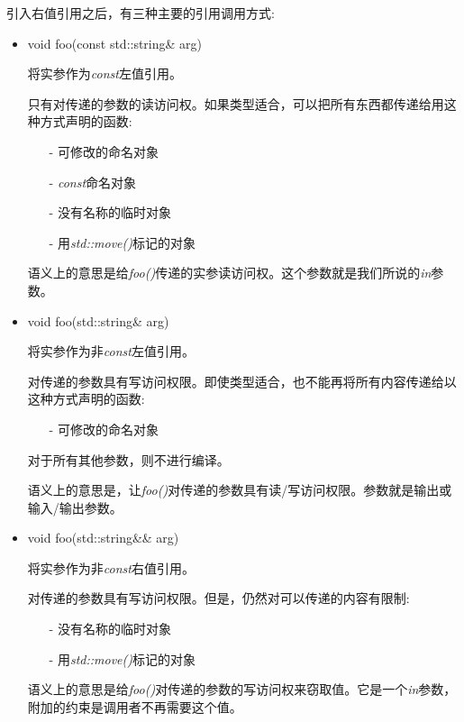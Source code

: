 引入右值引用之后，有三种主要的引用调用方式:

\begin{itemize}
	\item \begin{cppcode}
void foo(const std::string\& arg)
\end{cppcode}
	将实参作为\textit{const}左值引用。

	只有对传递的参数的读访问权。如果类型适合，可以把所有东西都传递给用这种方式声明的函数:

	\begin{itemize}
		\item[-] 可修改的命名对象
		\item[-] \textit{const}命名对象
		\item[-] 没有名称的临时对象
		\item[-] 用\textit{std::move()}标记的对象
	\end{itemize}
	语义上的意思是给\textit{foo()}传递的实参读访问权。这个参数就是我们所说的\textit{in}参数。
	\item \begin{cppcode}
void foo(std::string\& arg)
\end{cppcode}
	将实参作为非\textit{const}左值引用。

	对传递的参数具有写访问权限。即使类型适合，也不能再将所有内容传递给以这种方式声明的函数:

	\begin{itemize}
		\item[-] 可修改的命名对象
	\end{itemize}
	对于所有其他参数，则不进行编译。

	语义上的意思是，让\textit{foo()}对传递的参数具有读/写访问权限。参数就是输出或输入/输出参数。

	\item \begin{cppcode}
void foo(std::string\&\& arg)
\end{cppcode}
	将实参作为非\textit{const}右值引用。

	对传递的参数具有写访问权限。但是，仍然对可以传递的内容有限制:

	\begin{itemize}
		\item[-] 没有名称的临时对象
		\item[-] 用\textit{std::move()}标记的对象
	\end{itemize}
	语义上的意思是给\textit{foo()}对传递的参数的写访问权来窃取值。它是一个\textit{in}参数，附加的约束是调用者不再需要这个值。
\end{itemize}

